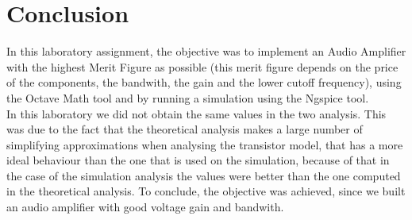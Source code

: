 

\section{Conclusion}
\label{sec:conclusion}



In this laboratory assignment, the objective was to implement an Audio Amplifier with the highest Merit Figure as possible (this merit figure depends on the price of the components, the bandwith, the gain and the lower cutoff frequency), using the Octave Math tool and by running a simulation using the Ngspice tool.\\
In this laboratory we did not obtain the same values in the two analysis. This was due to the fact that the theoretical analysis makes a large number of simplifying approximations when analysing the transistor model, that has a more ideal behaviour than the one that is used on the simulation, because of that in the case of the simulation analysis the values were better than the one computed in the theoretical analysis.  
To conclude, the objective was achieved, since we built an audio amplifier with good voltage gain and bandwith.





